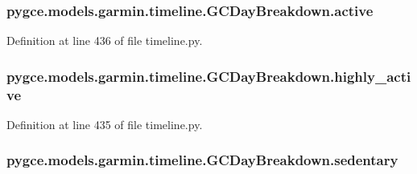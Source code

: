 \subsubsection[{\texorpdfstring{active}{active}}]{\setlength{\rightskip}{0pt plus 5cm}pygce.\+models.\+garmin.\+timeline.\+G\+C\+Day\+Breakdown.\+active}\hypertarget{classpygce_1_1models_1_1garmin_1_1timeline_1_1_g_c_day_breakdown_afabd12a8a6d22c156f9495483e4419b6}{}\label{classpygce_1_1models_1_1garmin_1_1timeline_1_1_g_c_day_breakdown_afabd12a8a6d22c156f9495483e4419b6}


Definition at line 436 of file timeline.\+py.

\subsubsection[{\texorpdfstring{highly\+\_\+active}{highly_active}}]{\setlength{\rightskip}{0pt plus 5cm}pygce.\+models.\+garmin.\+timeline.\+G\+C\+Day\+Breakdown.\+highly\+\_\+active}\hypertarget{classpygce_1_1models_1_1garmin_1_1timeline_1_1_g_c_day_breakdown_a736edad716e1770862ceac10f2d262e3}{}\label{classpygce_1_1models_1_1garmin_1_1timeline_1_1_g_c_day_breakdown_a736edad716e1770862ceac10f2d262e3}


Definition at line 435 of file timeline.\+py.

\subsubsection[{\texorpdfstring{sedentary}{sedentary}}]{\setlength{\rightskip}{0pt plus 5cm}pygce.\+models.\+garmin.\+timeline.\+G\+C\+Day\+Breakdown.\+sedentary}\hypertarget{classpygce_1_1models_1_1garmin_1_1timeline_1_1_g_c_day_breakdown_a03d898e7c3c8131ff30e0316d7257739}{}\label{classpygce_1_1models_1_1garmin_1_1timeline_1_1_g_c_day_breakdown_a03d898e7c3c8131ff30e0316d7257739}


